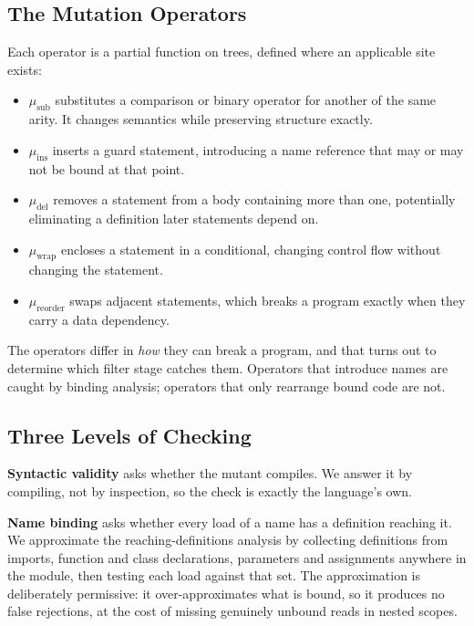 \documentclass[10pt,journal,compsoc,twocolumn]{IEEEtran}
\begin{document}
\subsection{The Mutation Operators}


Each operator is a partial function on trees, defined where an applicable site exists:

\begin{itemize}
  \item $\mu_{\text{sub}}$ substitutes a comparison or binary operator for another of the same arity. It changes semantics while preserving structure exactly.
  \item $\mu_{\text{ins}}$ inserts a guard statement, introducing a name reference that may or may not be bound at that point.
  \item $\mu_{\text{del}}$ removes a statement from a body containing more than one, potentially eliminating a definition later statements depend on.
  \item $\mu_{\text{wrap}}$ encloses a statement in a conditional, changing control flow without changing the statement.
  \item $\mu_{\text{reorder}}$ swaps adjacent statements, which breaks a program exactly when they carry a data dependency.
\end{itemize}

The operators differ in \textit{how} they can break a program, and that turns out to determine which filter stage catches them. Operators that introduce names are caught by binding analysis; operators that only rearrange bound code are not.


\subsection{Three Levels of Checking}


\textbf{Syntactic validity} asks whether the mutant compiles. We answer it by compiling, not by inspection, so the check is exactly the language's own.

\textbf{Name binding} asks whether every load of a name has a definition reaching it. We approximate the reaching-definitions analysis by collecting definitions from imports, function and class declarations, parameters and assignments anywhere in the module, then testing each load against that set. The approximation is deliberately permissive: it over-approximates what is bound, so it produces no false rejections, at the cost of missing genuinely unbound reads in nested scopes.
\end{document}
